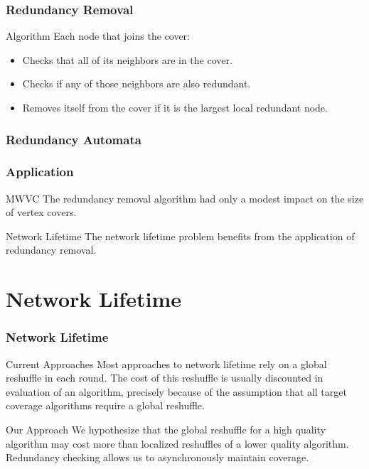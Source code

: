 \begin{frame}
	\frametitle{Redundancy Removal}
	\begin{block}{Algorithm}
	Each node that joins the cover:
	\begin{itemize}
	\item Checks that all of its neighbors are in the cover.
	\item Checks if any of those neighbors are also redundant.
	\item Removes itself from the cover if it is the largest local redundant node.
	\end{itemize}
	\end{block}
\end{frame}

\begin{frame}
  \frametitle{Redundancy Automata}
    
\end{frame}

\begin{frame}
	\frametitle{Application}
	\begin{block}{MWVC}
	The redundancy removal algorithm had only a modest impact on the size of vertex covers.
	\end{block}
	\begin{block}{Network Lifetime}
	The network lifetime problem benefits from the application of redundancy removal.
	\end{block}
\end{frame}

\section{Network Lifetime}

\begin{frame}
  \frametitle{Network Lifetime}
	\begin{block}{Current Approaches}
	Most approaches to network lifetime rely on a global reshuffle in each round\cite{1640702}. The cost of this reshuffle is usually discounted in evaluation of an algorithm, precisely because of the assumption that all target coverage algorithms require a global reshuffle.
	\end{block}
	\begin{block}{Our Approach}
	We hypothesize that the global reshuffle for a high quality algorithm may cost more than localized reshuffles of a lower quality algorithm. Redundancy checking allows us to asynchronously maintain coverage.
	\end{block}
\end{frame}

